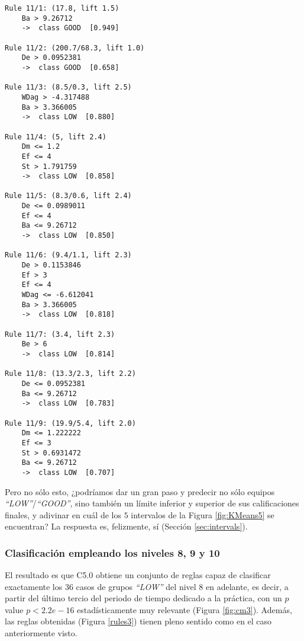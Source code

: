 \begin{tcolorbox}[title=Reglas de clasificación para identificar grupos de tipo \emph{``LOW''}.]
  \makeatletter
  \makeatother
\begin{multicols}{2}
    \begin{verbatim}
Rule 11/1: (17.8, lift 1.5)
	Ba > 9.26712
	->  class GOOD  [0.949]

Rule 11/2: (200.7/68.3, lift 1.0)
	De > 0.0952381
	->  class GOOD  [0.658]

Rule 11/3: (8.5/0.3, lift 2.5)
	WDag > -4.317488
	Ba > 3.366005
	->  class LOW  [0.880]

Rule 11/4: (5, lift 2.4)
	Dm <= 1.2
	Ef <= 4
	St > 1.791759
	->  class LOW  [0.858]

Rule 11/5: (8.3/0.6, lift 2.4)
	De <= 0.0989011
	Ef <= 4
	Ba <= 9.26712
	->  class LOW  [0.850]

Rule 11/6: (9.4/1.1, lift 2.3)
	De > 0.1153846
	Ef > 3
	Ef <= 4
	WDag <= -6.612041
	Ba > 3.366005
	->  class LOW  [0.818]

Rule 11/7: (3.4, lift 2.3)
	Be > 6
	->  class LOW  [0.814]

Rule 11/8: (13.3/2.3, lift 2.2)
	De <= 0.0952381
	Ba <= 9.26712
	->  class LOW  [0.783]

Rule 11/9: (19.9/5.4, lift 2.0)
	Dm <= 1.222222
	Ef <= 3
	St > 0.6931472
	Ba <= 9.26712
	->  class LOW  [0.707]
    \end{verbatim}
  \end{multicols}
\label{rules2}
\end{tcolorbox}

Pero no sólo esto, ¿podríamos dar un gran paso y predecir no sólo equipos \emph{``LOW''}/\emph{``GOOD''}, sino también un límite inferior y superior de sus calificaciones finales, y adivinar en cuál de los $5$ intervalos de la Figura \ref{fig:KMeans5} se encuentran? La respuesta es, felizmente, sí (Sección \ref{sec:intervals}).

\subsubsection{Clasificación empleando los niveles 8, 9 y 10}

El resultado es que C5.0 obtiene un conjunto de reglas capaz de clasificar exactamente los $36$ casos de grupos \emph{``LOW''} del nivel $8$ en adelante, es decir, a partir del último tercio del periodo de tiempo dedicado a la práctica, con un $p$ value $p < 2.2e-16$ estadísticamente muy relevante (Figura \ref{fig:cm3}). Además, las reglas obtenidas (Figura \ref{rules3}) tienen pleno sentido como en el caso anteriormente visto.

